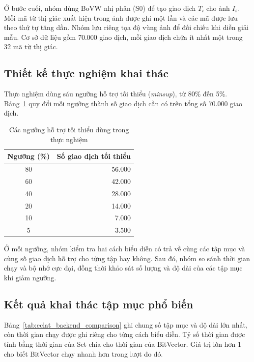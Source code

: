 Ở bước cuối, nhóm dùng BoVW nhị phân (S0) để tạo giao dịch $T_i$ cho ảnh $I_i$. Mỗi mã từ thị giác xuất hiện trong ảnh được ghi một lần và các mã được lưu theo thứ tự tăng dần. Nhóm lưu riêng tọa độ vùng ảnh để đối chiếu khi diễn giải mẫu. Cơ sở dữ liệu gồm 70.000 giao dịch, mỗi giao dịch chứa ít nhất một trong 32 mã từ thị giác.

\subsection{Thiết kế thực nghiệm khai thác}

Thực nghiệm dùng sáu ngưỡng hỗ trợ tối thiểu (\textit{minsup}), từ 80\% đến 5\%. Bảng~\ref{tab:fim_minsup} quy đổi mỗi ngưỡng thành số giao dịch cần có trên tổng số 70.000 giao dịch.

\begin{table}[!t]
    \centering
    \caption{Các ngưỡng hỗ trợ tối thiểu dùng trong thực nghiệm}
    \label{tab:fim_minsup}
    \begin{tabular}{c r}
        \hline
        \textbf{Ngưỡng (\%)} & \textbf{Số giao dịch tối thiểu} \\
        \hline
        80 & 56.000 \\
        60 & 42.000 \\
        40 & 28.000 \\
        20 & 14.000 \\
        10 &  7.000 \\
         5 &  3.500 \\
        \hline
    \end{tabular}
\end{table}

Ở mỗi ngưỡng, nhóm kiểm tra hai cách biểu diễn có trả về cùng các tập mục và cùng số giao dịch hỗ trợ cho từng tập hay không. Sau đó, nhóm so sánh thời gian chạy và bộ nhớ cực đại, đồng thời khảo sát số lượng và độ dài của các tập mục khi giảm ngưỡng.

\subsection{Kết quả khai thác tập mục phổ biến}
\label{subsec:fashion_fim_results}

 Bảng~\ref{tab:eclat_backend_comparison} ghi chung số tập mục và độ dài lớn nhất, còn thời gian chạy được ghi riêng cho từng cách biểu diễn. Tỷ số thời gian được tính bằng thời gian của Set chia cho thời gian của BitVector. Giá trị lớn hơn 1 cho biết BitVector chạy nhanh hơn trong lượt đo đó.

